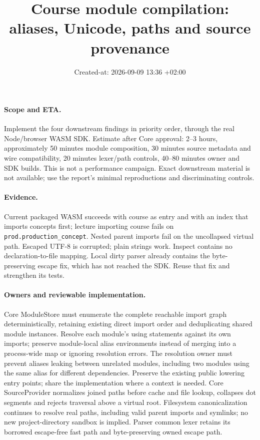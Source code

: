 \documentclass[11pt,a4paper]{article}
\title{Course module compilation: aliases, Unicode, paths and source provenance}
\date{Created-at: 2026-09-09 13:36 +02:00}
\begin{document}
\maketitle
\paragraph{Scope and ETA.} Implement the four downstream findings in priority order,
through the real Node/browser WASM SDK. Estimate after Core approval: 2--3 hours,
approximately 50 minutes module composition, 30 minutes source metadata and wire
compatibility, 20 minutes lexer/path controls, 40--80 minutes owner and SDK builds.
This is not a performance campaign. Exact downstream material is not available;
use the report's minimal reproductions and discriminating controls.
\paragraph{Evidence.} Current packaged WASM succeeds with course as entry and with
an index that imports concepts first; lecture importing course fails on
\texttt{prod.production\_concept}. Nested parent imports fail on the uncollapsed
virtual path. Escaped UTF-8 is corrupted; plain strings work. Inspect contains no
declaration-to-file mapping. Local dirty parser already contains the byte-preserving
escape fix, which has not reached the SDK. Reuse that fix and strengthen its tests.
\paragraph{Owners and reviewable implementation.} Core ModuleStore must enumerate
the complete reachable import graph deterministically, retaining existing direct
import order and deduplicating shared module instances. Resolve each module's
using statements against its own imports; preserve module-local alias environments
instead of merging into a process-wide map or ignoring resolution errors. The
resolution owner must prevent aliases leaking between unrelated modules, including
two modules using the same alias for different dependencies. Preserve the existing
public lowering entry points; share the implementation where a context is needed.
Core SourceProvider normalizes joined paths before cache and file lookup, collapses
dot segments and rejects traversal above a virtual root. Filesystem canonicalization
continues to resolve real paths, including valid parent imports and symlinks; no new
project-directory sandbox is implied. Parser common lexer retains its borrowed
escape-free fast path and byte-preserving owned escape path.
\end{document}
